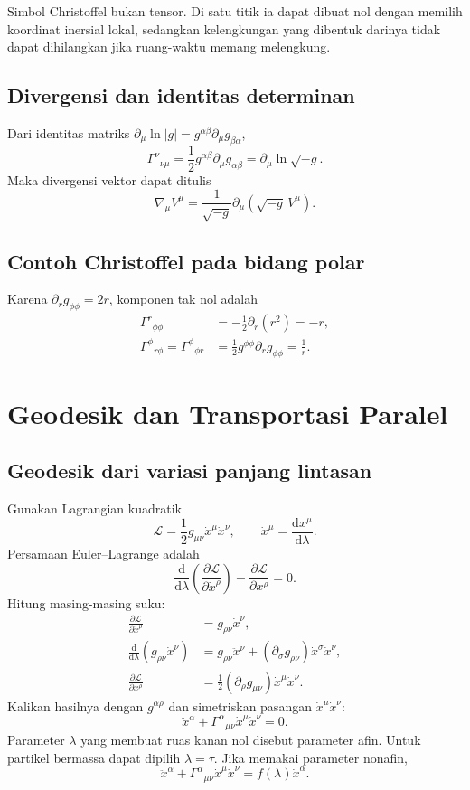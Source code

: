 \documentclass[12pt,a4paper]{report}
\newcommand{\dd}{\mathrm{d}}
\newcommand{\pd}{\partial}
\newcommand{\Lag}{\mathcal{L}}
\begin{document}
Simbol Christoffel bukan tensor. Di satu titik ia dapat dibuat nol dengan memilih
koordinat inersial lokal, sedangkan kelengkungan yang dibentuk darinya tidak dapat
dihilangkan jika ruang-waktu memang melengkung.

\section{Divergensi dan identitas determinan}

Dari identitas matriks $\pd_\mu\ln|g|=g^{\alpha\beta}\pd_\mu g_{\beta\alpha}$,
\[
 \Gamma^\nu{}_{\nu\mu}
 =\frac12g^{\alpha\beta}\pd_\mu g_{\alpha\beta}
 =\pd_\mu\ln\sqrt{-g}.
\]
Maka divergensi vektor dapat ditulis
\[
 \boxed{
 \nabla_\mu V^\mu
 =\frac{1}{\sqrt{-g}}\pd_\mu\left(\sqrt{-g}\,V^\mu\right)}.
\]

\section{Contoh Christoffel pada bidang polar}

Karena $\pd_r g_{\phi\phi}=2r$, komponen tak nol adalah
\begin{align}
 \Gamma^r{}_{\phi\phi}
 &=-\frac12\pd_r(r^2)=-r,\\
 \Gamma^\phi{}_{r\phi}=\Gamma^\phi{}_{\phi r}
 &=\frac12g^{\phi\phi}\pd_r g_{\phi\phi}=\frac1r.
\end{align}

\chapter{Geodesik dan Transportasi Paralel}

\section{Geodesik dari variasi panjang lintasan}

Gunakan Lagrangian kuadratik
\[
 \Lag=\frac12g_{\mu\nu}\dot x^\mu\dot x^\nu,
 \qquad \dot x^\mu=\frac{\dd x^\mu}{\dd\lambda}.
\]
Persamaan Euler--Lagrange adalah
\[
 \frac{\dd}{\dd\lambda}\left(\frac{\pd\Lag}{\pd\dot x^\rho}\right)
 -\frac{\pd\Lag}{\pd x^\rho}=0.
\]
Hitung masing-masing suku:
\begin{align}
 \frac{\pd\Lag}{\pd\dot x^\rho}&=g_{\rho\nu}\dot x^\nu,\\
 \frac{\dd}{\dd\lambda}(g_{\rho\nu}\dot x^\nu)
 &=g_{\rho\nu}\ddot x^\nu
 +(\pd_\sigma g_{\rho\nu})\dot x^\sigma\dot x^\nu,\\
 \frac{\pd\Lag}{\pd x^\rho}
 &=\frac12(\pd_\rho g_{\mu\nu})\dot x^\mu\dot x^\nu.
\end{align}
Kalikan hasilnya dengan $g^{\alpha\rho}$ dan simetriskan pasangan
$\dot x^\mu\dot x^\nu$:
\[
 \boxed{
 \ddot x^\alpha+\Gamma^\alpha{}_{\mu\nu}\dot x^\mu\dot x^\nu=0}.
\]
Parameter $\lambda$ yang membuat ruas kanan nol disebut parameter afin. Untuk
partikel bermassa dapat dipilih $\lambda=\tau$. Jika memakai parameter nonafin,
\[
 \ddot x^\alpha+\Gamma^\alpha{}_{\mu\nu}\dot x^\mu\dot x^\nu
 =f(\lambda)\dot x^\alpha.
\]
\end{document}

